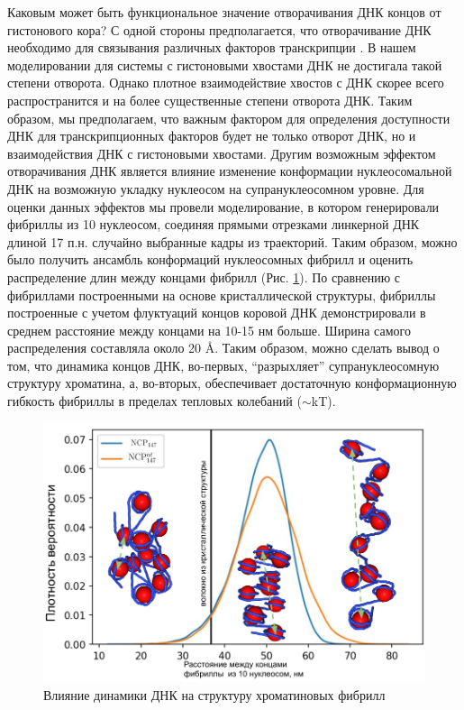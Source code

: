 Каковым может быть функциональное значение отворачивания ДНК концов от гистонового кора? С одной стороны предполагается, что отворачивание ДНК необходимо для связывания различных факторов транскрипции \cite{li_rapid_2005}. В нашем моделировании для системы с гистоновыми хвостами ДНК не достигала такой степени отворота. Однако плотное взаимодействие хвостов с ДНК скорее всего распространится и на более существенные степени отворота ДНК. Таким образом, мы предполагаем, что важным фактором для определения доступности ДНК для транскрипционных факторов будет не только отворот ДНК, но и взаимодействия ДНК с гистоновыми хвостами. Другим возможным эффектом отворачивания ДНК является влияние изменение конформации нуклеосомальной ДНК на возможную укладку нуклеосом на супрануклеосомном уровне. Для оценки данных эффектов мы провели моделирование, в котором генерировали фибриллы из 10 нуклеосом, соединяя прямыми отрезками линкерной ДНК длиной 17 п.н. случайно выбранные  кадры из траекторий. Таким образом, можно было получить ансамбль конформаций нуклеосомных фибрилл и оценить распределение длин между концами фибрилл (Рис. \ref{fig:p2_3:f4}). По сравнению с фибриллами построенными на основе кристаллической структуры, фибриллы построенные с учетом флуктуаций концов коровой ДНК демонстрировали в среднем расстояние между концами на 10-15 нм больше. Ширина самого распределения составляла около 20 \AA. Таким образом, можно сделать вывод о том, что динамика концов ДНК, во-первых, ``разрыхляет'' супрануклеосомную структуру хроматина, а, во-вторых, обеспечивает достаточную конформационную гибкость фибриллы в пределах тепловых колебаний ($\sim$kT). 



\begin{figure}[H]
    \centering
    \includegraphics[width=\textwidth]{images/p2/10ms/fig4.pdf}
    \caption[Влияние динамики ДНК на структуру хроматиновых фибрилл]{Влияние динамики ДНК на структуру хроматиновых фибрилл}
    \label{fig:p2_3:f4}
\end{figure}


